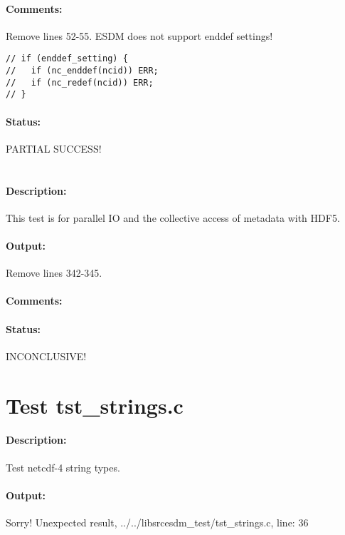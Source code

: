 \paragraph{Comments:} Remove lines 52-55. ESDM does not support enddef settings!

\begin{verbatim}
// if (enddef_setting) {
//   if (nc_enddef(ncid)) ERR;
//   if (nc_redef(ncid)) ERR;
// }
\end{verbatim}

\paragraph{Status:} PARTIAL SUCCESS!

\section{{\color{blue}{FIX ME! Test tst\_simplerw\_coll\_r.c}}}

\paragraph{Description:} This test is for parallel IO and the collective access of metadata with HDF5.

\paragraph{Output:}

Remove lines 342-345.

\paragraph{Comments:}

\paragraph{Status:} INCONCLUSIVE!

\section{Test tst\_strings.c}

\paragraph{Description:} Test netcdf-4 string types.

\paragraph{Output:} Sorry! Unexpected result, ../../libsrcesdm\_test/tst\_strings.c, line: 36

